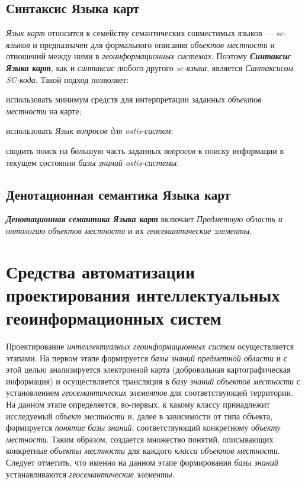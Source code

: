 \subsection{Синтаксис Языка карт}
\label{chapter_gis_sec_map_syntax}

\textit{Язык карт} относится к семейству семантических совместимых языков --- \textit{sc-языков} и предназначен для формального описания \textit{объектов местности} и отношений между ними в \textit{геоинформационных системах}. Поэтому \textbf{\textit{Синтаксис Языка карт}}, как и \textit{синтаксис} любого другого \textit{sc-языка}, является \textit{Синтаксисом SC-кода}. Такой подход позволяет:
\begin{textitemize}
\item использовать минимум средств для интерпретации заданных \textit{объектов местности} на карте;
\item использовать \textit{Язык вопросов для ostis-систем};
\item сводить поиск на большую часть заданных \textit{вопросов} к поиску информации в текущем состоянии \textit{базы знаний ostis-системы}.
\end{textitemize}

\subsection{Денотационная семантика Языка карт}
\label{chapter_gis_sec_map_semantics}

\textbf{\textit{Денотационная семантика Языка карт}} включает \textit{Предметную область и онтологию объектов местности} и их \textit{геосемантические элементы}.

\section{Средства автоматизации проектирования интеллектуальных геоинформационных систем}
\label{chapter_gis_sec_automatization}

Проектирование \textit{интеллектуалных геоинформационных систем} осуществляется этапами. 
На первом этапе формируется \textit{базы знаний} \textit{предметной области} и с этой целью анализируется электронной карта (добровольная картографическая информация) и осуществляется трансляция в \textit{базу знаний} \textit{объектов местности} с установлением \textit{геосемантических элементов} для соответствующей территории. На данном этапе определяется, во-первых, к какому классу принадлежит исследуемый \textit{объект местности} и, далее в зависимости от типа объекта, формируется \textit{понятие} \textit{базы знаний}, соответствующий конкретному \textit{объекту местности}. Таким образом, создается множество понятий, описывающих конкретные \textit{объекты местности} для каждого \textit{класса объектов местности\scnsupergroupsign}. Следует отметить, что именно на данном этапе формирования \textit{базы знаний} устанавливаются \textit{геосемантические элементы}.

